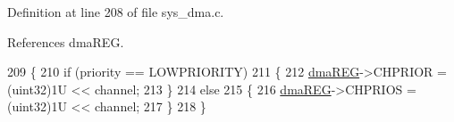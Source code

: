 Definition at line 208 of file sys\+\_\+dma.\+c.



References dma\+R\+EG.


\begin{DoxyCode}
209 \{
210     \textcolor{keywordflow}{if} (priority == LOWPRIORITY)
211     \{
212         \mbox{\hyperlink{reg__dma_8h_aae27308852f460efc99fcbf6eb47ea86}{dmaREG}}->CHPRIOR = (uint32)1U << channel;
213     \}
214     \textcolor{keywordflow}{else}
215     \{
216         \mbox{\hyperlink{reg__dma_8h_aae27308852f460efc99fcbf6eb47ea86}{dmaREG}}->CHPRIOS = (uint32)1U << channel;
217     \}
218 \}
\end{DoxyCode}

